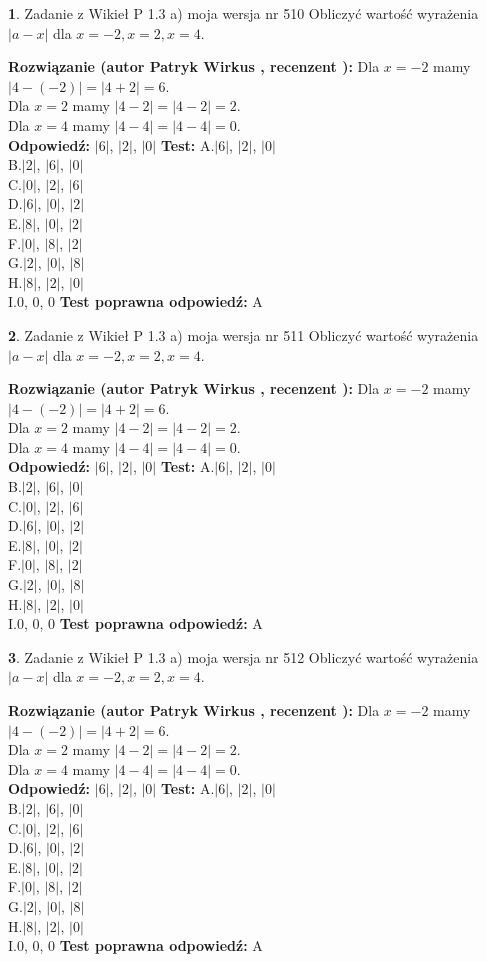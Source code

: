 \documentclass[12pt, a4paper]{article}
\theoremstyle{definition} %
\newtheorem{zad}{}
\newcommand{\zadStart}[1]{\begin{zad}#1\newline}
\newcommand{\zadStop}{\end{zad}}
\newcommand{\rozwStart}[2]{\noindent \textbf{Rozwiązanie (autor #1 , recenzent #2): }\newline}
\newcommand{\rozwStop}{\newline}
\newcommand{\odpStart}{\noindent \textbf{Odpowiedź:}\newline}
\newcommand{\odpStop}{\newline}
\newcommand{\testStart}{\noindent \textbf{Test:}\newline}
\newcommand{\testStop}{\newline}
\newcommand{\kluczStart}{\noindent \textbf{Test poprawna odpowiedź:}\newline}
\newcommand{\kluczStop}{\newline}
\begin{document}
\zadStart{Zadanie z Wikieł P 1.3 a) moja wersja nr 510}
Obliczyć wartość wyrażenia $|a - x|$ dla $x=-2,x=2,x=4$.
\zadStop
\rozwStart{Patryk Wirkus}{}
Dla $x = -2$ mamy $|4 - (-2)| = |4 + 2| = 6$.\\
Dla $x = 2$ mamy $|4 - 2| = |4 - 2| = 2$.\\
Dla $x = 4$ mamy $|4 - 4| = |4 - 4| = 0$.\\
\rozwStop
\odpStart
$|6|$, $|2|$, $|0|$
\odpStop
\testStart
A.$|6|$, $|2|$, $|0|$\\
B.$|2|$, $|6|$, $|0|$\\
C.$|0|$, $|2|$, $|6|$\\
D.$|6|$, $|0|$, $|2|$\\
E.$|8|$, $|0|$, $|2|$\\
F.$|0|$, $|8|$, $|2|$\\
G.$|2|$, $|0|$, $|8|$\\
H.$|8|$, $|2|$, $|0|$\\
I.$0$, $0$, $0$
\testStop
\kluczStart
A
\kluczStop



\zadStart{Zadanie z Wikieł P 1.3 a) moja wersja nr 511}
Obliczyć wartość wyrażenia $|a - x|$ dla $x=-2,x=2,x=4$.
\zadStop
\rozwStart{Patryk Wirkus}{}
Dla $x = -2$ mamy $|4 - (-2)| = |4 + 2| = 6$.\\
Dla $x = 2$ mamy $|4 - 2| = |4 - 2| = 2$.\\
Dla $x = 4$ mamy $|4 - 4| = |4 - 4| = 0$.\\
\rozwStop
\odpStart
$|6|$, $|2|$, $|0|$
\odpStop
\testStart
A.$|6|$, $|2|$, $|0|$\\
B.$|2|$, $|6|$, $|0|$\\
C.$|0|$, $|2|$, $|6|$\\
D.$|6|$, $|0|$, $|2|$\\
E.$|8|$, $|0|$, $|2|$\\
F.$|0|$, $|8|$, $|2|$\\
G.$|2|$, $|0|$, $|8|$\\
H.$|8|$, $|2|$, $|0|$\\
I.$0$, $0$, $0$
\testStop
\kluczStart
A
\kluczStop



\zadStart{Zadanie z Wikieł P 1.3 a) moja wersja nr 512}
Obliczyć wartość wyrażenia $|a - x|$ dla $x=-2,x=2,x=4$.
\zadStop
\rozwStart{Patryk Wirkus}{}
Dla $x = -2$ mamy $|4 - (-2)| = |4 + 2| = 6$.\\
Dla $x = 2$ mamy $|4 - 2| = |4 - 2| = 2$.\\
Dla $x = 4$ mamy $|4 - 4| = |4 - 4| = 0$.\\
\rozwStop
\odpStart
$|6|$, $|2|$, $|0|$
\odpStop
\testStart
A.$|6|$, $|2|$, $|0|$\\
B.$|2|$, $|6|$, $|0|$\\
C.$|0|$, $|2|$, $|6|$\\
D.$|6|$, $|0|$, $|2|$\\
E.$|8|$, $|0|$, $|2|$\\
F.$|0|$, $|8|$, $|2|$\\
G.$|2|$, $|0|$, $|8|$\\
H.$|8|$, $|2|$, $|0|$\\
I.$0$, $0$, $0$
\testStop
\kluczStart
A
\kluczStop
\end{document}
